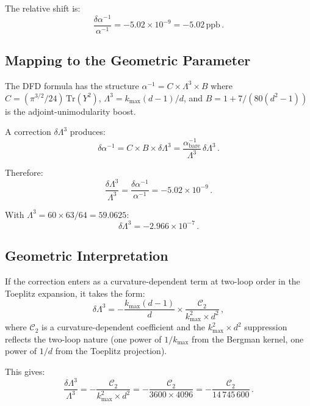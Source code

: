 \documentclass[12pt,a4paper]{article}
\theoremstyle{definition}
\theoremstyle{remark}
\newcommand{\Tr}{\mathrm{Tr}}
\newcommand{\inv}{^{-1}}
\newcommand{\ppb}{\,\mathrm{ppb}}
\begin{document}
The relative shift is:
\begin{equation}
\frac{\delta\alpha\inv}{\alpha\inv} = -5.02 \times 10^{-9}
= -5.02\ppb\,.
\end{equation}

\subsection{Mapping to the Geometric Parameter}

The DFD formula has the structure $\alpha\inv = C \times \Lambda^3 \times B$
where $C = (\pi^{3/2}/24)\,\Tr(Y^2)$, $\Lambda^3 = k_{\max}(d-1)/d$, and
$B = 1 + 7/(80(d^2-1))$ is the adjoint-unimodularity boost.

A correction $\delta\Lambda^3$ produces:
\begin{equation}
\delta\alpha\inv = C \times B \times \delta\Lambda^3
= \frac{\alpha\inv_{\mathrm{bare}}}{\Lambda^3}\,\delta\Lambda^3\,.
\end{equation}

Therefore:
\begin{equation}
\frac{\delta\Lambda^3}{\Lambda^3} = \frac{\delta\alpha\inv}{\alpha\inv}
= -5.02 \times 10^{-9}\,.
\end{equation}

With $\Lambda^3 = 60 \times 63/64 = 59.0625$:
\begin{equation}
\delta\Lambda^3 = -2.966 \times 10^{-7}\,.
\end{equation}

\subsection{Geometric Interpretation}

If the correction enters as a curvature-dependent term at two-loop order in
the Toeplitz expansion, it takes the form:
\begin{equation}
\label{eq:correction-form}
\delta\Lambda^3 = -\frac{k_{\max}(d-1)}{d} \times
\frac{\mathcal{C}_2}{k_{\max}^2 \times d^2}\,,
\end{equation}
where $\mathcal{C}_2$ is a curvature-dependent coefficient and the
$k_{\max}^2 \times d^2$ suppression reflects the two-loop nature
(one power of $1/k_{\max}$ from the Bergman kernel, one power of $1/d$
from the Toeplitz projection).

This gives:
\begin{equation}
\frac{\delta\Lambda^3}{\Lambda^3}
= -\frac{\mathcal{C}_2}{k_{\max}^2 \times d^2}
= -\frac{\mathcal{C}_2}{3600 \times 4096}
= -\frac{\mathcal{C}_2}{14\,745\,600}\,.
\end{equation}
\end{document}

